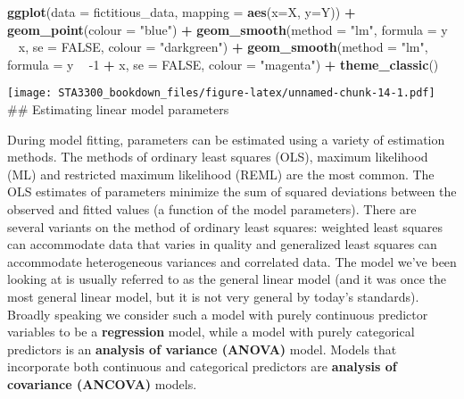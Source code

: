 \documentclass[
]{book}
\newenvironment{Shaded}{\begin{snugshade}}{\end{snugshade}}
\newcommand{\DataTypeTok}[1]{\textcolor[rgb]{0.13,0.29,0.53}{#1}}
\newcommand{\DecValTok}[1]{\textcolor[rgb]{0.00,0.00,0.81}{#1}}
\newcommand{\KeywordTok}[1]{\textcolor[rgb]{0.13,0.29,0.53}{\textbf{#1}}}
\newcommand{\NormalTok}[1]{#1}
\newcommand{\OperatorTok}[1]{\textcolor[rgb]{0.81,0.36,0.00}{\textbf{#1}}}
\newcommand{\OtherTok}[1]{\textcolor[rgb]{0.56,0.35,0.01}{#1}}
\newcommand{\StringTok}[1]{\textcolor[rgb]{0.31,0.60,0.02}{#1}}
\begin{document}
\begin{Shaded}
\begin{Highlighting}[]
\KeywordTok{ggplot}\NormalTok{(}\DataTypeTok{data =}\NormalTok{ fictitious_data,}
       \DataTypeTok{mapping =} \KeywordTok{aes}\NormalTok{(}\DataTypeTok{x=}\NormalTok{X, }\DataTypeTok{y=}\NormalTok{Y)) }\OperatorTok{+}
\StringTok{   }\KeywordTok{geom_point}\NormalTok{(}\DataTypeTok{colour =} \StringTok{"blue"}\NormalTok{) }\OperatorTok{+}
\StringTok{   }\KeywordTok{geom_smooth}\NormalTok{(}\DataTypeTok{method =} \StringTok{"lm"}\NormalTok{,}
               \DataTypeTok{formula =}\NormalTok{ y }\OperatorTok{~}\StringTok{ }\NormalTok{x,}
               \DataTypeTok{se =} \OtherTok{FALSE}\NormalTok{,}
               \DataTypeTok{colour =} \StringTok{"darkgreen"}\NormalTok{) }\OperatorTok{+}
\StringTok{   }\KeywordTok{geom_smooth}\NormalTok{(}\DataTypeTok{method =} \StringTok{"lm"}\NormalTok{,}
               \DataTypeTok{formula =}\NormalTok{ y }\OperatorTok{~}\StringTok{ }\DecValTok{-1} \OperatorTok{+}\StringTok{ }\NormalTok{x,}
               \DataTypeTok{se =} \OtherTok{FALSE}\NormalTok{,}
               \DataTypeTok{colour =} \StringTok{"magenta"}\NormalTok{) }\OperatorTok{+}
\StringTok{   }\KeywordTok{theme_classic}\NormalTok{()}
\end{Highlighting}
\end{Shaded}

\texttt{[image: STA3300\_bookdown\_files/figure-latex/unnamed-chunk-14-1.pdf]}
\#\# Estimating linear model parameters

During model fitting, parameters can be estimated using a variety of estimation methods. The methods of ordinary least squares (OLS), maximum likelihood (ML) and restricted maximum likelihood (REML) are the most common. The OLS estimates of parameters minimize the sum of squared deviations between the observed and fitted values (a function of the model parameters). There are several variants on the method of ordinary least squares: weighted least squares can accommodate data that varies in quality and generalized least squares can accommodate heterogeneous variances and correlated data. The model we've been looking at is usually referred to as the general linear model (and it was once the most general linear model, but it is not very general by today's standards). Broadly speaking we consider such a model with purely continuous predictor variables to be a \textbf{regression} model, while a model with purely categorical predictors is an \textbf{analysis of variance (ANOVA)} model. Models that incorporate both continuous and categorical predictors are \textbf{analysis of covariance (ANCOVA)} models.
\end{document}
